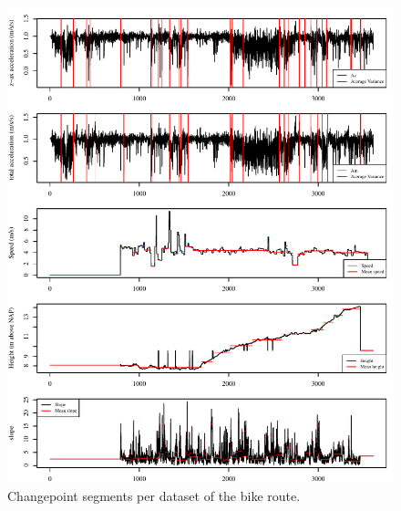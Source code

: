 \clearpage

\begin{figure}[ht]
\includegraphics[width=\textwidth]{img/R_ChangePointComparisonbike.pdf}
\centering
\caption{Changepoint segments per dataset of the bike route.\label{routeB}}
\end{figure} 



\clearpage